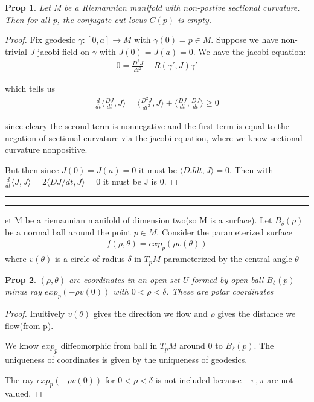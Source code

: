 \documentclass[11pt]{article}
\newcommand{\question}[2] {\vspace{.25in} \hrule\vspace{0.5em}
\noindent{\bf #1: #2} \vspace{0.5em}
\hrule \vspace{.10in}}
\newtheorem{prop}{Prop}
\begin{document}
\begin{prop}
	Let M be a Riemannian manifold with non-postive sectional curvature. Then for all p, the conjugate cut locus $C(p)$ is empty.
\end{prop}

\begin{proof}
	Fix geodesic $\gamma : [0,a] \to M$ with $\gamma(0) = p \in M$. Suppose we have non-trivial $J$ jacobi field on $\gamma$ with $J(0) = J(a) = 0$. We have the jacobi equation:
	\begin{align*}
		0 = \frac{D^2 J}{dt^2} + R(\gamma',J)\gamma'
	\end{align*}

	which tells us 
	\begin{align*}
		\frac{d}{dt}\langle \frac{DJ}{dt},J\rangle = \langle \frac{D^2J}{dt^2},J\rangle + \langle \frac{DJ}{dt},\frac{DJ}{dt}\rangle \geq 0
	\end{align*}

	since cleary the second term is nonnegative and the first term is equal to the negation of sectional curvature via the jacobi equation, where we know sectional curvature nonpositive.

	But then since $J(0) = J(a) = 0$ it must be $\langle DJ dt,J\rangle = 0$. Then with $\frac{d}{dt} \langle J,J\rangle = 2 \langle DJ/dt,J\rangle = 0$ it must be J is 0.
\end{proof}

\question{Question 4}

Let M be a riemannian manifold of dimension two(so M is a surface). Let $B_{\delta}(p)$ be a normal ball around the point $p \in M$. Consider the parameterized surface 
	\begin{align*}
		f(\rho,\theta) = exp_p (\rho v(\theta))
	\end{align*}
	where $v(\theta)$ is a circle of radius $\delta$ in $T_p M$ parameterized by the central angle $\theta$

\begin{prop}
	$(\rho,\theta)$ are coordinates in an open set $U$ formed by open ball $B_{\delta}(p)$ minus ray $exp_p(-\rho v(0))$ with $0 < \rho < \delta$. These are polar coordinates
\end{prop}

\begin{proof}
	Inuitively $v(\theta)$ gives the direction we flow and $\rho$ gives the distance we flow(from p). 

	We know $exp_p$ diffeomorphic from ball in $T_pM$ around 0 to $B_{\delta}(p)$. The uniqueness of coordinates is given by the uniqueness of geodesics. 

	The ray $exp_p(-\rho v(0))$ for $0 < \rho < \delta$ is not included because $-\pi,\pi$ are not valued.
\end{proof}
\end{document}
